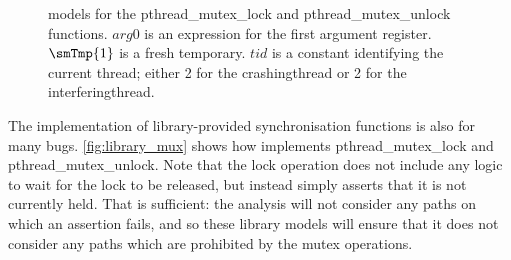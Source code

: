 \begin{figure}
  \centerline{
    {\hfill}
    {\hfill}
  }
  \vspace{-12pt}
  \caption{{\StateMachine} models for the pthread\_mutex\_lock and
    pthread\_mutex\_unlock functions.  $\mathit{arg0}$ is an
    expression for the first argument register.  $\smTmp{1}$ is a
    fresh {\StateMachine} temporary.  $\mathit{tid}$ is a constant
    identifying the current thread; either 2 for the
    \gls{crashingthread} or 2 for the \gls{interferingthread}.}
  \label{fig:library_mux}
\end{figure}

The implementation of library-provided synchronisation functions is
also for many bugs.  \autoref{fig:library_mux} shows how {\technique}
implements pthread\_mutex\_lock and pthread\_mutex\_unlock.  Note that
the lock operation does not include any logic to wait for the lock to
be released, but instead simply asserts that it is not currently held.
That is sufficient: the analysis will not consider any paths on which
an assertion fails, and so these library models will ensure that it
does not consider any paths which are prohibited by the mutex
operations.

